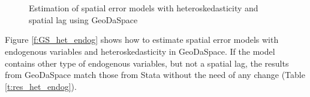 \documentclass{article}
\begin{document}
\begin{figure}[htb]
\centering
\caption{Estimation of spatial error models with heteroskedasticity and spatial lag using GeoDaSpace}
\label{f:GS_het_combo}
 \\
 \\
\end{figure}

Figure \ref{f:GS_het_endog} shows how to estimate spatial error models with endogenous variables and heteroskedasticity in GeoDaSpace. If the model contains other type of endogenous variables, but not a spatial lag, the results from GeoDaSpace match those from Stata without the need of any change (Table \ref{t:res_het_endog}).  
\end{document}
